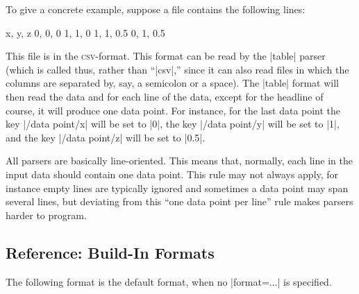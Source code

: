 To give a concrete example, suppose a file contains the following
lines:
\begin{codeexample}
x, y, z
0, 0, 0
1, 1, 0
1, 1, 0.5
0, 1, 0.5
\end{codeexample}
This file is in the \textsc{csv}-format. This format can be read by
the |table| parser (which is called thus, rather than ``|csv|,'' since
it can also read files in which the columns are separated by, say, a
semicolon or a space). The |table| format will then read the data and
for each line of the data, except for the headline of course, it will
produce one data point. For instance, for the last data point the key
|/data point/x| will be set to |0|, the key |/data point/y| will be
set to |1|, and the key |/data point/z| will be set to |0.5|.

All parsers are basically line-oriented. This means that, normally,
each line in the input data should contain one data point. This rule
may not always apply, for instance empty lines are typically ignored
and sometimes a data point may span several lines, but deviating from
this ``one data point per line'' rule makes parsers harder to
program. 


\subsection{Reference: Build-In Formats}

The following format is the default format, when no |format=...| is
specified.

